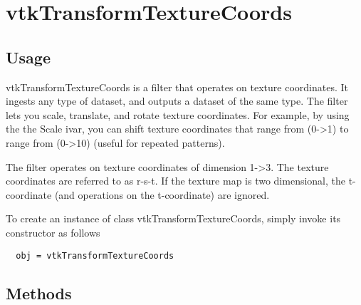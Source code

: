 \section{vtkTransformTextureCoords}

\subsection{Usage}

 vtkTransformTextureCoords is a filter that operates on texture
 coordinates. It ingests any type of dataset, and outputs a dataset of the
 same type. The filter lets you scale, translate, and rotate texture
 coordinates. For example, by using the the Scale ivar, you can shift
 texture coordinates that range from (0->1) to range from (0->10) (useful
 for repeated patterns).
 
 The filter operates on texture coordinates of dimension 1->3. The texture 
 coordinates are referred to as r-s-t. If the texture map is two dimensional,
 the t-coordinate (and operations on the t-coordinate) are ignored.

To create an instance of class vtkTransformTextureCoords, simply
invoke its constructor as follows
\begin{verbatim}
  obj = vtkTransformTextureCoords
\end{verbatim}
\subsection{Methods}

